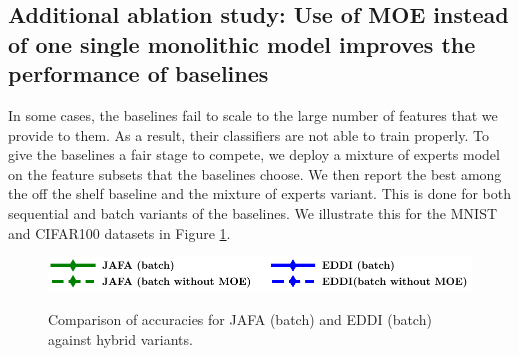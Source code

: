 \documentclass[letterpaper]{article}
\begin{document}
\subsection{Additional ablation study: Use of MOE instead of one single monolithic model improves the performance of baselines}
In some cases, the baselines fail to scale to the large number of features that we provide to them. As a result, their classifiers are not able to train properly. To give the baselines a fair stage to compete, we deploy a mixture of experts model on the feature subsets that the baselines choose. We then report the best among the off the shelf baseline and the mixture of experts variant. This is done for both sequential and batch variants of the baselines. We illustrate this for the MNIST and CIFAR100 datasets in Figure \ref{fig:hybrid}.
\begin{figure}[h]
    \centering
      \includegraphics[width=0.5\linewidth]{FIG/legend_hybrid_mnist.pdf}\\[-1ex]
\vspace{-1mm}
\caption{Comparison of accuracies for JAFA (batch) and EDDI (batch) against hybrid variants.}
    \label{fig:hybrid}
\end{figure}



\end{document}
